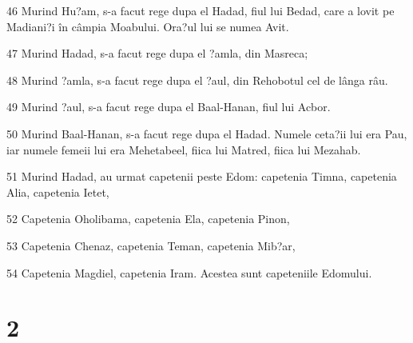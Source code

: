 \par 46 Murind Hu?am, s-a facut rege dupa el Hadad, fiul lui Bedad, care a lovit pe Madiani?i în câmpia Moabului. Ora?ul lui se numea Avit.
\par 47 Murind Hadad, s-a facut rege dupa el ?amla, din Masreca;
\par 48 Murind ?amla, s-a facut rege dupa el ?aul, din Rehobotul cel de lânga râu.
\par 49 Murind ?aul, s-a facut rege dupa el Baal-Hanan, fiul lui Acbor.
\par 50 Murind Baal-Hanan, s-a facut rege dupa el Hadad. Numele ceta?ii lui era Pau, iar numele femeii lui era Mehetabeel, fiica lui Matred, fiica lui Mezahab.
\par 51 Murind Hadad, au urmat capetenii peste Edom: capetenia Timna, capetenia Alia, capetenia Ietet,
\par 52 Capetenia Oholibama, capetenia Ela, capetenia Pinon,
\par 53 Capetenia Chenaz, capetenia Teman, capetenia Mib?ar,
\par 54 Capetenia Magdiel, capetenia Iram. Acestea sunt capeteniile Edomului.

\chapter{2}

